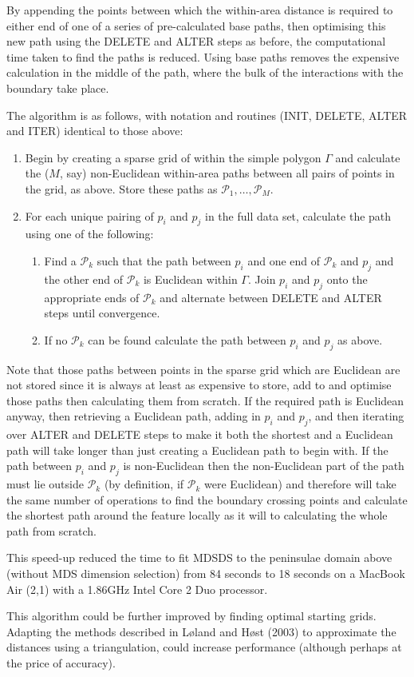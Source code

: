 \documentclass[useAMS, referee]{biom}
\begin{document}
By appending the points between which the within-area distance is required to either end of one of a series of pre-calculated base paths, then optimising this new path using the DELETE and ALTER steps as before,  the computational time taken to find the paths is reduced. Using base paths removes the expensive calculation in the middle of the path, where the bulk of the interactions with the boundary take place.

The algorithm is as follows, with notation and routines (INIT, DELETE, ALTER and ITER) identical to those above:
\begin{enumerate}
 \item Begin by creating a sparse grid of within the simple polygon $\Gamma$ and calculate the ($M$, say) non-Euclidean within-area paths between all pairs of points in the grid, as above. Store these paths as $\mathcal{P}_1,\ldots, \mathcal{P}_M$.
\item For each unique pairing of $p_i$ and $p_j$ in the full data set, calculate the path using one of the following:
\begin{enumerate}
\item Find a $\mathcal{P}_k$ such that the path between $p_i$ and one end of $\mathcal{P}_k$ and $p_j$ and the other end of $\mathcal{P}_k$ is Euclidean within $\Gamma$. Join $p_i$ and $p_j$ onto the appropriate ends of $\mathcal{P}_k$ and alternate between DELETE and ALTER steps until convergence.
\item If no $\mathcal{P}_k$ can be found calculate the path between $p_i$ and $p_j$ as above. 
\end{enumerate}
\end{enumerate}

Note that those paths between points in the sparse grid which are Euclidean are not stored since it is always at least as expensive to store, add to and optimise those paths then calculating them from scratch. If the required path is Euclidean anyway, then retrieving a Euclidean path, adding in $p_i$ and $p_j$, and then iterating over ALTER and DELETE steps to make it both the shortest and a Euclidean path will take longer than just creating a Euclidean path to begin with. If the path between $p_i$ and $p_j$ is non-Euclidean then the non-Euclidean part of the path must lie outside $\mathcal{P}_k$ (by definition, if $\mathcal{P}_k$ were Euclidean) and therefore will take the same number of operations to find the boundary crossing points and calculate the shortest path around the feature locally as it will to calculating the whole path from scratch.

This speed-up reduced the time to fit MDSDS to the peninsulae domain above (without MDS dimension selection) from 84 seconds to 18 seconds on a MacBook Air (2,1) with a 1.86GHz Intel Core 2 Duo processor.

This algorithm could be further improved by finding optimal starting grids. Adapting the methods described in L{\o}land and H{\o}st (2003) to approximate the distances using a triangulation, could increase performance (although perhaps at the price of accuracy).



\label{lastpage}
\end{document}
